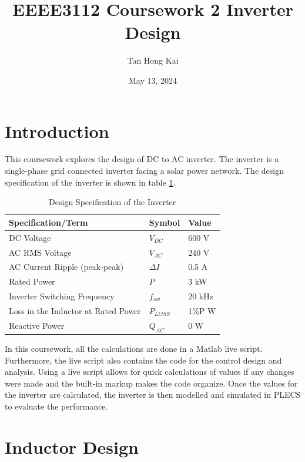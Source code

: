 \documentclass[12pt]{article}
\title{EEEE3112 Coursework 2 Inverter Design}
\author{Tan Hong Kai}
\date{May 13, 2024}
\begin{document}
\maketitle

\section{Introduction}

This coursework explores the design of DC to AC inverter.
The inverter is a single-phase grid connected inverter facing a solar power network.
The design specification of the inverter is shown in table \ref{tab:design-spec}.

\begin{table}[ht]
    \caption{Design Specification of the Inverter}
    \label{tab:design-spec}
    \centering{}
    \begin{tabular}{l l  l}
        \hline
        Specification/Term                  & Symbol      & Value  \\
        \hline
        DC Voltage                          & $V_{DC}$    & 600 V  \\
        AC RMS Voltage                      & $V_{AC}$    & 240 V  \\
        AC Current Ripple (peak-peak)       & $\Delta{I}$ & 0.5 A  \\
        Rated Power                         & $P$         & 3 kW   \\
        Inverter Switching Frequency        & $f_{sw}$    & 20 kHz \\
        Loss in the Inductor at Rated Power & $P_{LOSS}$  & 1\%P W \\
        Reactive Power                      & $Q_{AC}$    & 0 W    \\
        \hline
    \end{tabular}
\end{table}

In this coursework, all the calculations are done in a Matlab live script.
Furthermore, the live script also contains the code for the control design and analysis.
Using a live script allows for quick calculations of values if any changes were made and the built-in markup makes the code organize.
Once the values for the inverter are calculated, the inverter is then modelled and simulated in PLECS to evaluate the performance.

\section{Inductor Design}
\end{document}
